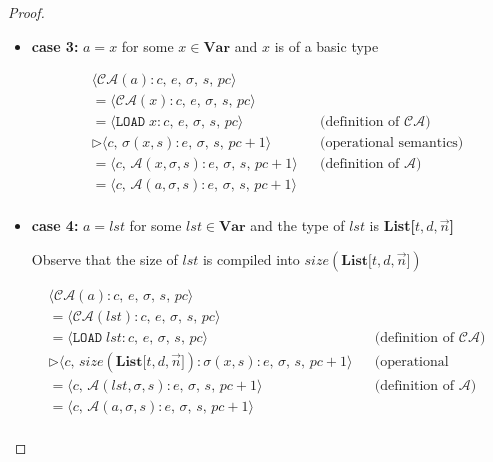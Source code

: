 \documentclass{article}
\begin{document}
\begin{proof}
\begin{itemize}
    \item \textbf{case 3: } $a = x$ for some $x \in \textbf{Var}$ and $x$ is of a basic type

    \[
      \begin{aligned}
        &\langle  \mathcal{CA}(a) : c,\, e,\, \sigma,\, s,\, pc \rangle \\
        &= \langle \mathcal{CA}(x) : c,\, e,\, \sigma,\, s,\, pc \rangle \\
        &= \langle \texttt{LOAD}\;x : c,\, e,\, \sigma,\, s,\, pc \rangle 
        && \text{(definition of } \mathcal{CA}\text{)} \\
        &\triangleright \langle c,\, \sigma(x, s) : e,\, \sigma,\, s,\, pc+1 \rangle 
        && \text{(operational semantics)} \\
        &= \langle c,\, \mathcal{A}(x, \sigma, s) : e,\, \sigma,\, s,\, pc+1 \rangle 
        && \text{(definition of } \mathcal{A}\text{)} \\
        &= \langle c,\, \mathcal{A}(a, \sigma, s) : e,\, \sigma,\, s,\, pc+1 \rangle \\
      \end{aligned}
  \]

  \item \textbf{case 4: } $a = lst$ for some $lst \in \textbf{Var}$ and the type of $lst$ is \textbf{List[$t, d, \vec{n}$]}

    Observe that the size of $lst$ is compiled into $size(\textbf{List[$t, d, \vec{n}$]})$

  \[
      \begin{aligned}
        &\langle  \mathcal{CA}(a) : c,\, e,\, \sigma,\, s,\, pc \rangle \\
        &= \langle \mathcal{CA}(lst) : c,\, e,\, \sigma,\, s,\, pc \rangle \\
        &= \langle \texttt{LOAD}\;lst : c,\, e,\, \sigma,\, s,\, pc \rangle 
        && \text{(definition of } \mathcal{CA}\text{)} \\
        &\triangleright \langle c,\, size(\textbf{List[$t, d, \vec{n}$]}) : \sigma(x, s) : e,\, \sigma,\, s,\, pc+1 \rangle 
        && \text{(operational semantics)} \\
        &= \langle c,\, \mathcal{A}(lst, \sigma, s) : e,\, \sigma,\, s,\, pc+1 \rangle 
        && \text{(definition of } \mathcal{A}\text{)} \\
        &= \langle c,\, \mathcal{A}(a, \sigma, s) : e,\, \sigma,\, s,\, pc+1 \rangle \\
      \end{aligned}
  \]


\end{itemize}
\end{proof}
\end{document}
